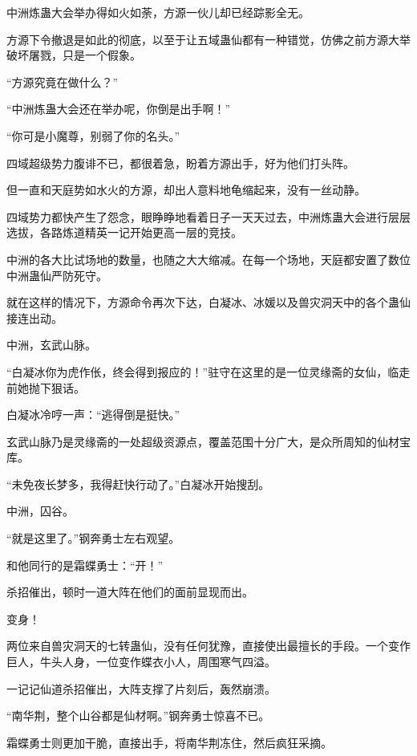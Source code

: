 
\begin{this_body}



中洲炼蛊大会举办得如火如荼，方源一伙儿却已经踪影全无。

方源下令撤退是如此的彻底，以至于让五域蛊仙都有一种错觉，仿佛之前方源大举破坏屠戮，只是一个假象。

“方源究竟在做什么？”

“中洲炼蛊大会还在举办呢，你倒是出手啊！”

“你可是小魔尊，别弱了你的名头。”

四域超级势力腹诽不已，都很着急，盼着方源出手，好为他们打头阵。

但一直和天庭势如水火的方源，却出人意料地龟缩起来，没有一丝动静。

四域势力都快产生了怨念，眼睁睁地看着日子一天天过去，中洲炼蛊大会进行层层选拔，各路炼道精英一记开始更高一层的竞技。

中洲的各大比试场地的数量，也随之大大缩减。在每一个场地，天庭都安置了数位中洲蛊仙严防死守。

就在这样的情况下，方源命令再次下达，白凝冰、冰媛以及兽灾洞天中的各个蛊仙接连出动。

中洲，玄武山脉。

“白凝冰你为虎作伥，终会得到报应的！”驻守在这里的是一位灵缘斋的女仙，临走前她抛下狠话。

白凝冰冷哼一声：“逃得倒是挺快。”

玄武山脉乃是灵缘斋的一处超级资源点，覆盖范围十分广大，是众所周知的仙材宝库。

“未免夜长梦多，我得赶快行动了。”白凝冰开始搜刮。

中洲，囚谷。

“就是这里了。”钢奔勇士左右观望。

和他同行的是霜蝶勇士：“开！”

杀招催出，顿时一道大阵在他们的面前显现而出。

变身！

两位来自兽灾洞天的七转蛊仙，没有任何犹豫，直接使出最擅长的手段。一个变作巨人，牛头人身，一位变作蝶衣小人，周围寒气四溢。

一记记仙道杀招催出，大阵支撑了片刻后，轰然崩溃。

“南华荆，整个山谷都是仙材啊。”钢奔勇士惊喜不已。

霜蝶勇士则更加干脆，直接出手，将南华荆冻住，然后疯狂采摘。


\end{this_body}
